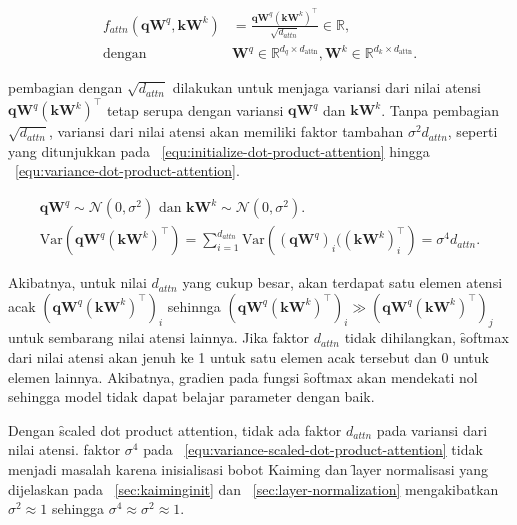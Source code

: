 	\begin{align}
		\label{equ:scaled-dot-product-attention}
		f_{attn}(\mathbf{q} \mathbf{W}^q, \mathbf{k} \mathbf{W}^k) &= \frac{\mathbf{q} \mathbf{W}^q (\mathbf{k} \mathbf{W}^k)^{\top}}{\sqrt{d_{attn}}} \in \mathbb{R}, \\
		\text{dengan } &\mathbf{W}^q \in \mathbb{R}^{d_q \times d_{\text{attn}}}, \mathbf{W}^k \in \mathbb{R}^{d_k \times d_{\text{attn}}}.
	\end{align}

	pembagian dengan $\sqrt{d_{attn}}$ dilakukan untuk menjaga variansi dari nilai atensi $\mathbf{q} \mathbf{W}^q (\mathbf{k} \mathbf{W}^k)^{\top}$ tetap serupa dengan variansi $\mathbf{qW}^q$ dan $\mathbf{kW}^k$. Tanpa pembagian $\sqrt{d_{attn}}$, variansi dari nilai atensi akan memiliki faktor tambahan $\sigma^2 d_{attn}$, seperti yang ditunjukkan pada \equ~\ref{equ:initialize-dot-product-attention} hingga \equ~\ref{equ:variance-dot-product-attention}.

	\begin{align}
		\label{equ:initialize-dot-product-attention}
		\mathbf{qW}^q \sim \mathcal{N}(0, \sigma^2) \text{ dan } \mathbf{kW}^k \sim \mathcal{N}(0, \sigma^2). \\
		\label{equ:variance-dot-product-attention}
		\text{Var}(\mathbf{qW}^q (\mathbf{kW}^k)^{\top}) = \sum_{i=1}^{d_{attn}} \text{Var}\left((\mathbf{qW}^q)_i ((\mathbf{kW}^k)^{\top}_i\right) = \sigma^4 d_{attn}.
	\end{align}
	
	Akibatnya, untuk nilai $d_{attn}$ yang cukup besar, akan terdapat satu elemen atensi acak $(\mathbf{qW}^q (\mathbf{kW}^k)^{\top})_i$ sehinnga $(\mathbf{qW}^q (\mathbf{kW}^k)^{\top})_i \gg (\mathbf{qW}^q (\mathbf{kW}^k)^{\top})_j$ untuk sembarang nilai atensi lainnya. Jika faktor $d_{attn}$ tidak dihilangkan, \f{softmax} dari nilai atensi akan jenuh ke 1 untuk satu elemen acak tersebut dan 0 untuk elemen lainnya. Akibatnya, gradien pada fungsi \f{softmax} akan mendekati nol sehingga model tidak dapat belajar parameter dengan baik. 

	Dengan \f{scaled dot product attention}, tidak ada faktor $d_{attn}$ pada variansi dari nilai atensi. faktor $\sigma^4$ pada \equ~\ref{equ:variance-scaled-dot-product-attention} tidak menjadi masalah karena inisialisasi bobot Kaiming dan \f{layer normalisasi} yang dijelaskan pada \sect~\ref{sec:kaiminginit} dan \sect~\ref{sec:layer-normalization} mengakibatkan $\sigma^2 \approx 1$ sehingga $\sigma^4 \approx \sigma^2 \approx 1$.

